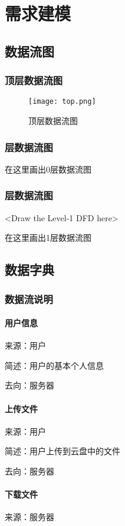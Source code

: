 \chapter{需求建模 }
\section{数据流图}
\subsection{顶层数据流图}

\begin{figure}[ht]
\centering
\texttt{[image: top.png]}
\caption{顶层数据流图}\label{fig:noted-figure}
\end{figure}

\subsection{层数据流图}

在这里画出0层数据流图
 
\subsection{层数据流图}
<Draw the Level-1 DFD here>

在这里画出1层数据流图

\section{数据字典}
\subsection{数据流说明}
\subsubsection{用户信息}
来源：用户

简述：用户的基本个人信息

去向：服务器

\subsubsection{上传文件}
来源：用户

简述：用户上传到云盘中的文件

去向：服务器

\subsubsection{下载文件}
来源：服务器

